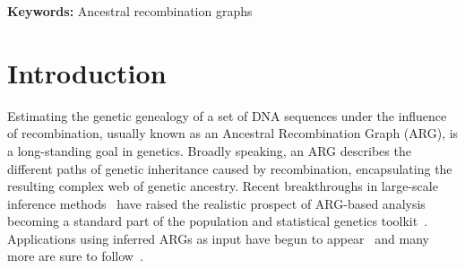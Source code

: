 \documentclass{article}
\begin{document}
\textbf{Keywords:} Ancestral recombination graphs

\linenumbers
\section{Introduction}
\label{sec-intro}
Estimating the genetic genealogy of a set of DNA sequences
under the influence of recombination,
usually known as an Ancestral Recombination Graph (ARG), is a long-standing
goal in genetics.
Broadly speaking, an ARG describes the different paths of genetic inheritance
caused by recombination, encapsulating the resulting complex web of genetic
ancestry.
Recent breakthroughs
in large-scale inference
methods~\citep{rasmussen2014genome,kelleher2019inferring,speidel2019method,
schaefer2021ancestral,wohns2022unified,zhang2023biobank,zhan2023towards,deng2024robust}
have raised the realistic prospect of ARG-based analysis becoming a standard part
of the population and statistical genetics toolkit~\citep{hejase2020summary}.
Applications using inferred ARGs as input have begun to
appear~\citep{osmond2021estimating,
fan2022genealogical,
hejase2022deep,
guo2022recombination,
zhang2023biobank,
nowbandegani2023extremely,
ignatieva2023distribution,
fan2023likelihood,
link2023tree,
grundler2024geographic,
huang2024estimating,
korfmann2024simultaneous,
deraje2024inferring}
and many more are sure to
follow~\citep{harris2019database,harris2023using}.
\end{document}

